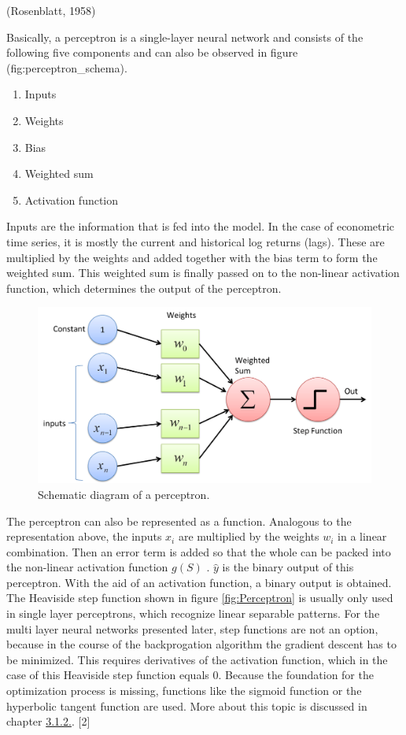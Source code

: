 \documentclass[
]{article}
\begin{document}
(Rosenblatt, 1958)

Basically, a perceptron is a single-layer neural network and consists of
the following five components and can also be observed in figure
\textbackslash@ref(fig:perceptron\_schema).

\begin{enumerate}
\def\labelenumi{\arabic{enumi}.}
\item
  Inputs
\item
  Weights
\item
  Bias
\item
  Weighted sum
\item
  Activation function
\end{enumerate}

Inputs are the information that is fed into the model. In the case of
econometric time series, it is mostly the current and historical log
returns (lags). These are multiplied by the weights and added together
with the bias term to form the weighted sum. This weighted sum is
finally passed on to the non-linear activation function, which
determines the output of the perceptron.

\begin{figure}

{\centering \includegraphics[width=0.8\linewidth]{images/Perceptron} 

}

\caption{Schematic diagram of a perceptron.}\label{fig:perceptron_schema}
\end{figure}

The perceptron can also be represented as a function. Analogous to the
representation above, the inputs \(x_{i}\) are multiplied by the weights
\(w_{i}\) in a linear combination. Then an error term is added so that
the whole can be packed into the non-linear activation function \(g(S)\)
. \(\hat{y}\) is the binary output of this perceptron. With the aid of
an activation function, a binary output is obtained. The Heaviside step
function shown in figure \ref{fig:Perceptron} is usually only used in
single layer perceptrons, which recognize linear separable patterns. For
the multi layer neural networks presented later, step functions are not
an option, because in the course of the backprogation algorithm the
gradient descent has to be minimized. This requires derivatives of the
activation function, which in the case of this Heaviside step function
equals 0. Because the foundation for the optimization process is
missing, functions like the sigmoid function or the hyperbolic tangent
function are used. More about this topic is discussed in chapter
\protect\hyperlink{backprogation_algorithm}{3.1.2.}. {[}2{]}
\end{document}
